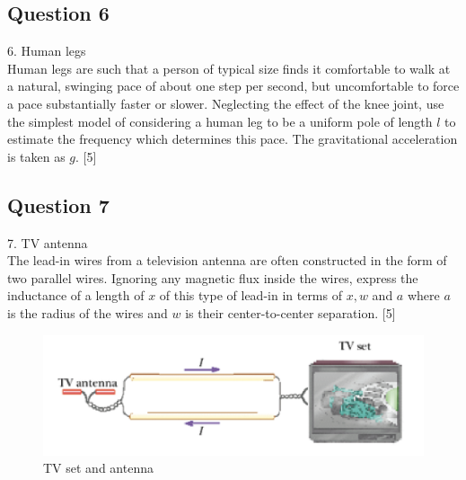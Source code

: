 \documentclass{article}
\begin{document}
\subsection{Question 6}
6. Human legs \\
Human legs are such that a person of typical size finds it comfortable to walk at a natural, swinging pace of about one step per second, but uncomfortable to force a pace substantially faster or slower. Neglecting the effect of the knee joint, use the simplest model of considering a human leg to be a uniform pole of length $l$ to estimate the frequency which determines this pace. The gravitational acceleration is taken as $g$. [5] 

\subsection{Question 7} 
7. TV antenna \\ The lead-in wires from a television antenna are often constructed in the form of two parallel wires. Ignoring any magnetic flux inside the wires, express the inductance of a length of $x$ of this type of lead-in in terms of $x, w$ and $a$ where $a$ is the radius of the wires and $w$ is their center-to-center separation. [5]

\begin{figure}
	\centering
	\includegraphics[width=0.5\linewidth]{spho_book_TYS_images/2015q7.png}
	\caption{TV set and antenna}
\end{figure}
\end{document}
